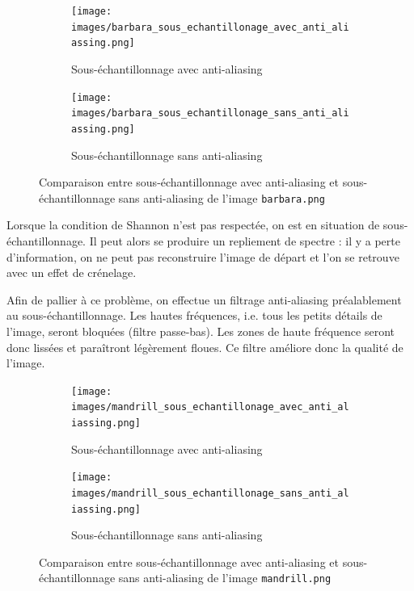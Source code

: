 \documentclass[a4paper]{article}
\begin{document}
\begin{figure}[H]
    \centering
    \begin{subfigure}[c]{0.46\textwidth}
        \centering
        \texttt{[image: images/barbara\_sous\_echantillonage\_avec\_anti\_aliassing.png]}
        \caption{Sous-échantillonnage avec anti-aliasing} 
        \label{subfig:barbara-avec-anti-aliasing}
    \end{subfigure}
    \begin{subfigure}[c]{0.46\textwidth}
        \centering
        \texttt{[image: images/barbara\_sous\_echantillonage\_sans\_anti\_aliassing.png]}
        \caption{Sous-échantillonnage sans anti-aliasing} 
        \label{subfig:barbara-sans-anti-aliasing}
    \end{subfigure}
    \caption{Comparaison entre sous-échantillonnage avec anti-aliasing et
    sous-échantillonnage sans anti-aliasing de l'image \texttt{barbara.png}}
    \label{fig:filtrage-anti-aliasing}
\end{figure}

Lorsque la condition de Shannon n'est pas respectée, on est en situation de
sous-échantillonnage. Il peut alors se produire un repliement de spectre : il y
a perte d'information, on ne peut pas reconstruire l'image de départ et l'on se
retrouve avec un effet de crénelage.

Afin de pallier à ce problème, on effectue un filtrage anti-aliasing
préalablement au sous-échantillonnage. Les hautes fréquences, i.e. tous les
petits détails de l'image, seront bloquées (filtre passe-bas). Les zones de
haute fréquence seront donc lissées et paraîtront légèrement floues. Ce filtre
améliore donc la qualité de l'image.

\begin{figure}[H]
    \centering
    \begin{subfigure}[c]{0.46\textwidth}
        \centering
        \texttt{[image: images/mandrill\_sous\_echantillonage\_avec\_anti\_aliassing.png]}
        \caption{Sous-échantillonnage avec anti-aliasing} 
        \label{subfig:mandrill-avec-anti-aliasing}
    \end{subfigure}
    \begin{subfigure}[c]{0.46\textwidth}
        \centering
        \texttt{[image: images/mandrill\_sous\_echantillonage\_sans\_anti\_aliassing.png]}
        \caption{Sous-échantillonnage sans anti-aliasing} 
        \label{subfig:mandrill-sans-anti-aliasing}
    \end{subfigure}
    \caption{Comparaison entre sous-échantillonnage avec anti-aliasing et
    sous-échantillonnage sans anti-aliasing de l'image \texttt{mandrill.png}}
    \label{fig:filtrage-anti-aliasing}
\end{figure}
\end{document}
